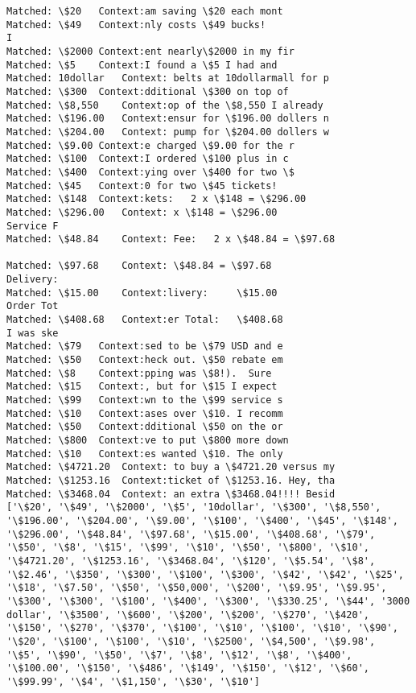 \documentclass[11pt]{article}
\begin{document}
    \begin{Verbatim}[commandchars=\\\{\}]
Matched: \$20	Context:am saving \$20 each mont
Matched: \$49	Context:nly costs \$49 bucks!
I 
Matched: \$2000	Context:ent nearly\$2000 in my fir
Matched: \$5	Context:I found a \$5 I had and
Matched: 10dollar	Context: belts at 10dollarmall for p
Matched: \$300	Context:dditional \$300 on top of
Matched: \$8,550	Context:op of the \$8,550 I already
Matched: \$196.00	Context:ensur for \$196.00 dollers n
Matched: \$204.00	Context: pump for \$204.00 dollers w
Matched: \$9.00	Context:e charged \$9.00 for the r
Matched: \$100	Context:I ordered \$100 plus in c
Matched: \$400	Context:ying over \$400 for two \$
Matched: \$45	Context:0 for two \$45 tickets! 
Matched: \$148	Context:kets:	2 x \$148 = \$296.00
Matched: \$296.00	Context: x \$148 = \$296.00
Service F
Matched: \$48.84	Context: Fee:	2 x \$48.84 = \$97.68

Matched: \$97.68	Context: \$48.84 = \$97.68
Delivery:
Matched: \$15.00	Context:livery:	 	\$15.00
Order Tot
Matched: \$408.68	Context:er Total:	\$408.68
I was ske
Matched: \$79	Context:sed to be \$79 USD and e
Matched: \$50	Context:heck out. \$50 rebate em
Matched: \$8	Context:pping was \$8!).  Sure 
Matched: \$15	Context:, but for \$15 I expect 
Matched: \$99	Context:wn to the \$99 service s
Matched: \$10	Context:ases over \$10. I recomm
Matched: \$50	Context:dditional \$50 on the or
Matched: \$800	Context:ve to put \$800 more down
Matched: \$10	Context:es wanted \$10. The only
Matched: \$4721.20	Context: to buy a \$4721.20 versus my
Matched: \$1253.16	Context:ticket of \$1253.16. Hey, tha
Matched: \$3468.04	Context: an extra \$3468.04!!!! Besid
['\$20', '\$49', '\$2000', '\$5', '10dollar', '\$300', '\$8,550', '\$196.00', '\$204.00', '\$9.00', '\$100', '\$400', '\$45', '\$148', '\$296.00', '\$48.84', '\$97.68', '\$15.00', '\$408.68', '\$79', '\$50', '\$8', '\$15', '\$99', '\$10', '\$50', '\$800', '\$10', '\$4721.20', '\$1253.16', '\$3468.04', '\$120', '\$5.54', '\$8', '\$2.46', '\$350', '\$300', '\$100', '\$300', '\$42', '\$42', '\$25', '\$18', '\$7.50', '\$50', '\$50,000', '\$200', '\$9.95', '\$9.95', '\$300', '\$300', '\$100', '\$400', '\$300', '\$330.25', '\$44', '3000 dollar', '\$3500', '\$600', '\$200', '\$200', '\$270', '\$420', '\$150', '\$270', '\$370', '\$100', '\$10', '\$100', '\$10', '\$90', '\$20', '\$100', '\$100', '\$10', '\$2500', '\$4,500', '\$9.98', '\$5', '\$90', '\$50', '\$7', '\$8', '\$12', '\$8', '\$400', '\$100.00', '\$150', '\$486', '\$149', '\$150', '\$12', '\$60', '\$99.99', '\$4', '\$1,150', '\$30', '\$10']

    \end{Verbatim}
\end{document}
